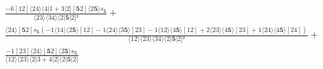 \documentclass[varwidth, border=5pt]{standalone}
\begin{document}
\begin{my}
$\begin{gathered}
\scriptscriptstyle\frac{-6[12]⟨24⟩⟨4|1+3|2][𝟓2]⟨2𝟓⟩s_{𝟓}}{⟨23⟩⟨34⟩⟨2|𝟓|2]³} +\\
\scriptscriptstyle\frac{⟨24⟩[𝟓2]s_{𝟓}(-1⟨14⟩⟨2𝟓⟩[12]-1⟨24⟩⟨3𝟓⟩[23]-1⟨12⟩⟨4𝟓⟩[12]+2⟨23⟩⟨4𝟓⟩[23]+1⟨24⟩⟨4𝟓⟩[24])}{⟨12⟩⟨23⟩⟨34⟩⟨2|𝟓|2]²} +\\
\scriptscriptstyle\frac{-1[23]⟨24⟩[𝟓2]⟨2𝟓⟩s_{𝟓}}{⟨12⟩⟨23⟩⟨2|3+4|2]⟨2|𝟓|2]} \phantom{+}
\end{gathered}$
\end{my}
\end{document}
